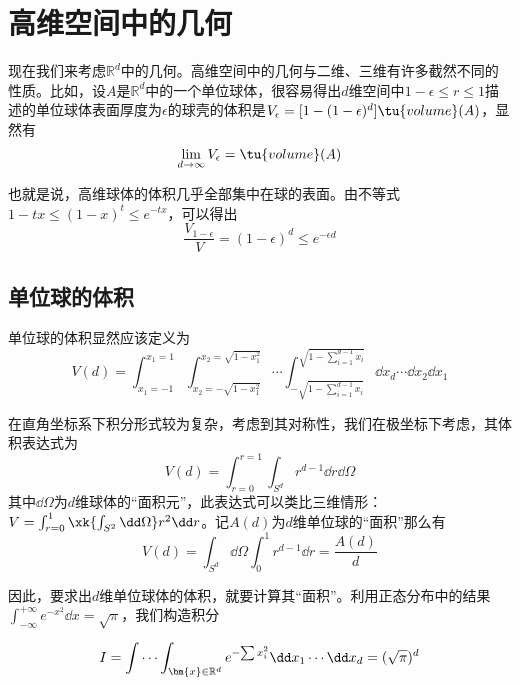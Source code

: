 \documentclass[UTF8]{ctexbook}
\begin{document}
\section{高维空间中的几何}

现在我们来考虑$\mathbb R^d$中的几何。高维空间中的几何与二维、三维有许多截然不同的性质。比如，设$A$是$\mathbb R^d $中的一个单位球体，很容易得出$d$维空间中$1-\epsilon \le r \le 1$描述的单位球体表面厚度为$\epsilon$的球壳的体积是$V_\epsilon = [1-(1-\epsilon)^d] \tu{volume}(A)$，显然有
\begin{equation}
	\lim_{d \to \infty} V_{\epsilon} = \tu{volume}(A)
\end{equation}

	也就是说，高维球体的体积几乎全部集中在球的表面。由不等式$1-tx \le (1-x)^t \le e^{-tx}$，可以得出
\begin{equation}
	\frac{V_{1-\epsilon}}{V} = (1-\epsilon)^d \le e^{-\epsilon d}
\end{equation}

\subsection{单位球的体积}
单位球的体积显然应该定义为
\begin{equation}
	V(d) = \int_{x_1=-1}^{x_1=1} \int_{x_2 = -\sqrt{1-x_1^2}}^{x_2 = \sqrt{1-x_1^2}} \cdots \int_{-\sqrt{1-\sum_{i=1}^{d-1}x_i}}^{\sqrt{1-\sum_{i=1}^{d-1}x_i}} \dd x_d \cdots \dd x_2 \dd x_1
\end{equation}

在直角坐标系下积分形式较为复杂，考虑到其对称性，我们在极坐标下考虑，其体积表达式为
\begin{equation}
	V(d) = \int_{r=0}^{r=1}\int_{S^{d}} r^{d-1} \dd r \dd \Omega
\end{equation}
其中$\dd \Omega$为$d$维球体的“面积元”，此表达式可以类比三维情形：$V = \int_{r=0}^{1} \xk{\int_{S^2} \dd \Omega } r^2 \dd r$。记$A(d)$为$d$维单位球的“面积”那么有
\begin{equation}
	V(d) = \int_{S^d} \dd \Omega \int_{0}^{1} r^{d-1}\dd r = \frac{A(d)}{d}
\end{equation}

因此，要求出$d$维单位球体的体积，就要计算其“面积”。利用正态分布中的结果$
\int_{-\infty}^{+\infty} e^{-x^2} \dd x = \sqrt{\pi}$，我们构造积分

\begin{equation}
I = \idotsint_{\bm{x}\in \mathbb R^d} e^{-{\sum x_i^2}} \dd x_1 \cdots \dd x_d = (\sqrt{\pi})^d
\end{equation}
\end{document}
